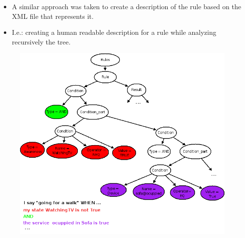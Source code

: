 \begin{frame}
\begin{columns}
\begin{column}{6cm}
	    \end{column}
	
\end{columns}

\end{frame}


\begin{frame}

	\begin{itemize}
	  	\item A similar approach was taken to create a description of the rule
	  	based on the XML file that represents it.
	  	\item I.e.: creating a human readable description for a rule while 
	  	analyzing recursively the tree.
	 \end{itemize}

	\begin{figure}
	 	\includegraphics[scale=0.23]{img/rule-tree.png}
	\end{figure}


\end{frame}
